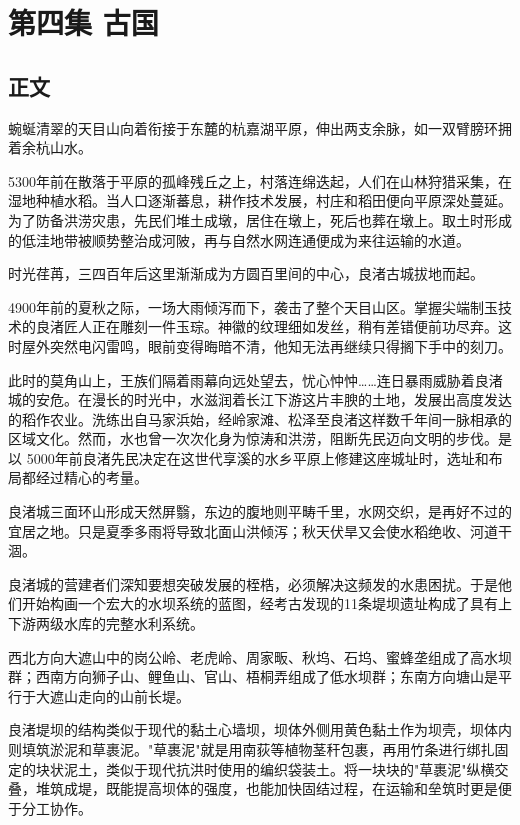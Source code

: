 \chapter{第四集 \quad 古国}

\section{正文}

蜿蜒清翠的天目山向着衔接于东麓的杭嘉湖平原，伸出两支余脉，如一双臂膀环拥着余杭山水。

5300年前在散落于平原的孤峰残丘之上，村落连绵迭起，人们在山林狩猎采集，在湿地种植水稻。当人口逐渐蕃息，耕作技术发展，村庄和稻田便向平原深处蔓延。为了防备洪涝灾患，先民们堆土成墩，居住在墩上，死后也葬在墩上。取土时形成的低洼地带被顺势整治成河陂，再与自然水网连通便成为来往运输的水道。

时光荏苒，三四百年后这里渐渐成为方圆百里间的中心，良渚古城拔地而起。

4900年前的夏秋之际，一场大雨倾泻而下，袭击了整个天目山区。掌握尖端制玉技术的良渚匠人正在雕刻一件玉琮。神徽的纹理细如发丝，稍有差错便前功尽弃。这时屋外突然电闪雷鸣，眼前变得晦暗不清，他知无法再继续只得搁下手中的刻刀。

此时的莫角山上，王族们隔着雨幕向远处望去，忧心忡忡……连日暴雨威胁着良渚城的安危。在漫长的时光中，水滋润着长江下游这片丰腴的土地，发展出高度发达的稻作农业。洗练出自马家浜始，经岭家滩、松泽至良渚这样数千年间一脉相承的区域文化。然而，水也曾一次次化身为惊涛和洪涝，阻断先民迈向文明的步伐。是以 5000年前良渚先民决定在这世代享溪的水乡平原上修建这座城址时，选址和布局都经过精心的考量。

良渚城三面环山形成天然屏翳，东边的腹地则平畴千里，水网交织，是再好不过的宜居之地。只是夏季多雨将导致北面山洪倾泻；秋天伏旱又会使水稻绝收、河道干涸。

良渚城的营建者们深知要想突破发展的桎梏，必须解决这频发的水患困扰。于是他们开始构画一个宏大的水坝系统的蓝图，经考古发现的11条堤坝遗址构成了具有上下游两级水库的完整水利系统。

西北方向大遮山中的岗公岭、老虎岭、周家畈、秋坞、石坞、蜜蜂垄组成了高水坝群；西南方向狮子山、鲤鱼山、官山、梧桐弄组成了低水坝群；东南方向塘山是平行于大遮山走向的山前长堤。

良渚堤坝的结构类似于现代的黏土心墙坝，坝体外侧用黄色黏土作为坝壳，坝体内则填筑淤泥和草裹泥。"草裹泥"就是用南荻等植物茎秆包裹，再用竹条进行绑扎固定的块状泥土，类似于现代抗洪时使用的编织袋装土。将一块块的"草裹泥"纵横交叠，堆筑成堤，既能提高坝体的强度，也能加快固结过程，在运输和垒筑时更是便于分工协作。

